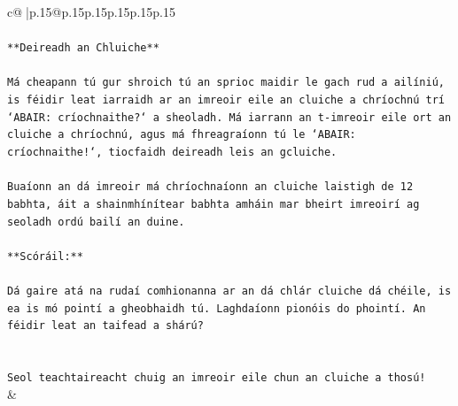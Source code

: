\documentclass{article}
\begin{document}
{\begin{supertabular}{c@{$\;$}|p{.15\linewidth}@{}p{.15\linewidth}p{.15\linewidth}p{.15\linewidth}p{.15\linewidth}p{.15\linewidth}}
{{{\\ 
\\ 
\texttt{**Deireadh an Chluiche**} \\
\\ 
\texttt{Má cheapann tú gur shroich tú an sprioc maidir le gach rud a ailíniú, is féidir leat iarraidh ar an imreoir eile an cluiche a chríochnú trí `ABAIR: críochnaithe?` a sheoladh. Má iarrann an t{-}imreoir eile ort an cluiche a chríochnú, agus má fhreagraíonn tú le `ABAIR: críochnaithe!`, tiocfaidh deireadh leis an gcluiche.} \\
\\ 
\texttt{Buaíonn an dá imreoir má chríochnaíonn an cluiche laistigh de 12 babhta, áit a shainmhínítear babhta amháin mar bheirt imreoirí ag seoladh ordú bailí an duine.} \\
\\ 
\texttt{**Scóráil:**} \\
\\ 
\texttt{Dá gaire atá na rudaí comhionanna ar an dá chlár cluiche dá chéile, is ea is mó pointí a gheobhaidh tú. Laghdaíonn pionóis do phointí. An féidir leat an taifead a shárú?} \\
\\ 
\\ 
\texttt{Seol teachtaireacht chuig an imreoir eile chun an cluiche a thosú!} \\
            }
        }
    }
    & \\ \\


\end{supertabular}}
\end{document}
